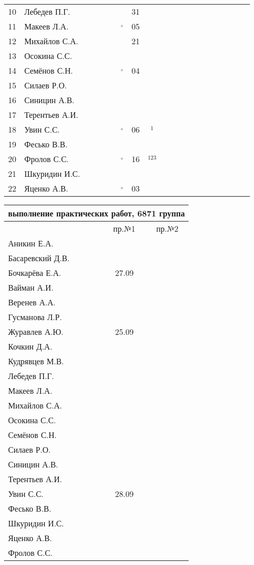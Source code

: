 \documentclass[a4paper,11pt]{article}
\newcommand*\OK{&\small \ding{51}$\!\!_\circ$} %
\newcommand*\ok{&{\small \ding{51}}} %
\newcommand*\no{&{\small }} %
\newcommand*\da{&{\small\ding{48}$\!\!_1$}} %
\newcommand*\dabc{&{\small\ding{48}$\!\!_{123}$}} %
\begin{document}
\begin{tabular}{l|l|cccccccccccccccccc}
10&Лебедев П.Г.    \ok\ok\no\ok\ok&31\no  \ok&&&&&&&&&&\\
11&Макеев Л.А.     \ok\ok\ok\ok\OK&05\ok  \ok&&&&&&&&&&\\
12&Михайлов С.А.   \no\no\ok\ok\ok&21\no  \ok&&&&&&&&&&\\
13&Осокина С.С.    \ok\ok\ok\ok\no\no\ok  \ok&&&&&&&&&&\\
14&Семёнов С.Н.    \ok\ok\ok\ok\OK&04\ok  \ok&&&&&&&&&&\\
15&Силаев Р.О.     \ok\ok\no\no\no\no\no  \no&&&&&&&&&&\\
16&Синицин А.В.    \ok\ok\no\ok\no\no\no  \no&&&&&&&&&&\\
17&Терентьев А.И.  \ok\ok\ok\ok\no\no\no  \no&&&&&&&&&&\\
18&Увин С.С.       \ok\ok\ok\ok\OK&06\da  \ok&&&&&&&&&&\\
19&Фесько В.В.     \no\no\no\no\no\no\no  \no&&&&&&&&&&\\
20&Фролов С.С.     \ok\ok\ok\ok\OK&16\dabc\ok&&&&&&&&&&\\ 
21&Шкуридин И.С.   \ok\ok\ok\ok\ok\no\ok  \ok&&&&&&&&&&\\
22&Яценко А.В.     \ok\ok\ok\ok\OK&03\ok  \ok&&&&&&&&&&\\ 
\bottomrule
\end{tabular} 
\newpage

\begin{tabular}{l|cc}
\multicolumn{3}{c}{выполнение практических работ, 6871 группа} \\
\toprule
& пр.№1 & пр.№2 \\
\midrule
Аникин Е.А.     &     &\\    
Басаревский Д.В.&     &\\
Бочкарёва Е.А.  &27.09&\\
Вайман А.И.     &     &\\
Веренев А.А.    &     &\\
Гусманова Л.Р.  &     &\\
Журавлев А.Ю.   &25.09&\\
Кочкин Д.А.     &     &\\
Кудрявцев М.В.  &     &\\
Лебедев П.Г.    &     &\\
Макеев Л.А.     &     &\\
Михайлов С.А.   &     &\\
Осокина С.С.    &     &\\
Семёнов С.Н.    &     &\\
Силаев Р.О.     &     &\\
Синицин А.В.    &     &\\
Терентьев А.И.  &     &\\
Увин С.С.       &28.09&\\
Фесько В.В.     &     &\\
Шкуридин И.С.   &     &\\
Яценко А.В.     &     &\\
Фролов С.С.     &     &\\
\bottomrule
\end{tabular}
\end{document}
